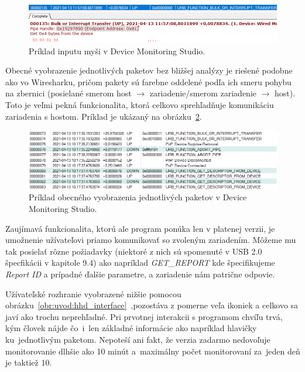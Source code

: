 \begin{figure}[!htb]
	\centering
	\includegraphics[width=\textwidth]{img/uvod_hhd_input}
	\caption{Príklad inputu myši v Device Monitoring Studio.}
	\label{obr:uvod:hhd_input}
\end{figure}

Obecné vyobrazenie jednotlivých paketov bez bližšej analýzy je riešené podobne ako vo Wiresharku, pričom pakety sú farebne oddelené podľa ich smeru pohybu na zbernici (posielané smerom host $\longrightarrow$ zariadenie/smerom zariadenie $\longrightarrow$ host). Toto je veľmi pekná funkcionalita, ktorá celkovo sprehľadňuje komunikáciu zariadenia s hostom. Príklad je ukázaný na obrázku~\ref{obr:uvod:hhd_listview}.

\begin{figure}[!htb]
	\centering
	\includegraphics[width=\textwidth]{img/uvod_hhd_listview}
	\caption{Príklad obecného vyobrazenia jednotlivých paketov v Device Monitoring Studio.}
	\label{obr:uvod:hhd_listview}
\end{figure}

Zaujímavá funkcionalita, ktorú ale program ponúka len v platenej verzii, je umožnenie užívateľovi priamo komunikovať so zvoleným zariadením. Môžeme mu tak posielať rôzne požiadavky (niektoré z nich sú spomenuté v USB 2.0 špecfikácii\cite{usbdoc} v kapitole 9.4) ako napríklad \textit{GET\_REPORT} kde špecifikujeme \textit{Report ID} a prípadné ďalšie parametre, a zariadenie nám patrične odpovie.

Užívateľské rozhranie vyobrazené nižšie pomocou obrázku~\ref{obr:uvod:hhd_interface}~,pozostáva z pomerne veľa ikoniek a celkovo sa javí ako trochu neprehľadné. Pri prvotnej interakcii s programom chvíľu trvá, kým človek nájde čo~i~len základné informácie ako napríklad hlavičky ku~jednotlivým paketom. Nepoteší ani fakt, že verzia zadarmo nedovoľuje monitorovanie dlhšie ako 10 minút a~maximálny počet monitorovaní za~jeden deň je taktiež 10.

